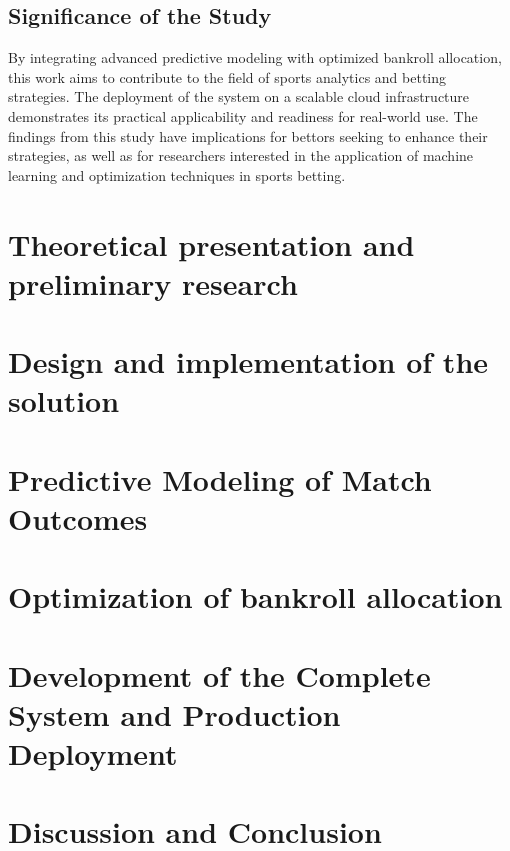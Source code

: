 \documentclass[10pt]{report}
\begin{document}
\section{Significance of the Study}

By integrating advanced predictive modeling with optimized bankroll allocation, this work aims to contribute to the field of sports analytics and betting strategies. The deployment of the system on a scalable cloud infrastructure demonstrates its practical applicability and readiness for real-world use. The findings from this study have implications for bettors seeking to enhance their strategies, as well as for researchers interested in the application of machine learning and optimization techniques in sports betting.

\chapter{Theoretical presentation and preliminary research}


\chapter{Design and implementation of the solution}


\chapter{Predictive Modeling of Match Outcomes}


\chapter{Optimization of bankroll allocation}


\chapter{Development of the Complete System and Production Deployment}


\chapter{Discussion and Conclusion}


\appendix


\printbibliography[heading=bibintoc,title={References}]
\end{document}
